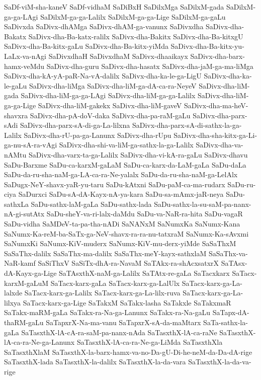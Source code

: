 {SaDf-viM-sha-kaneV
SaDf-vidhaM
SaDiBxH
SaDilxMga
SaDilxM-gada
SaDilxM-ga-ga-LAgi
SaDilxM-ga-ga-Lalilx
SaDilxM-ga-ga-Lige
SaDilxM-ga-gaLu
SaDivxda
SaDivx-dhAMga
SaDivx-dhAM-ga-vanunx
SaDivxdha
SaDivx-dha-Bakatx
SaDivx-dha-Ba-katx-ralilx
SaDivx-dha-Bakitx
SaDivx-dha-Ba-kitxgU
SaDivx-dha-Ba-kitx-gaLu
SaDivx-dha-Ba-kitx-yiMda
SaDivx-dha-Ba-kitx-yu-LaLx-va-nAgi
SaDivxdhaH
SaDivxdhaM
SaDivx-dhaaikayx
SaDivx-dha-barx-hamx-veMdu
SaDivx-dha-guru
SaDivx-dha-hasatx
SaDivx-dha-jaM-ga-ma-liMga
SaDivx-dha-kA-yA-paR-Na-vA-dalilx
SaDivx-dha-ka-le-ga-LigU
SaDivx-dha-ka-le-gaLu
SaDivx-dha-liMga
SaDivx-dha-liM-ga-dA-ca-ra-NeyeV
SaDivx-dha-liM-gada
SaDivx-dha-liM-ga-ga-LAgi
SaDivx-dha-liM-ga-ga-Lalilx
SaDivx-dha-liM-ga-ga-Lige
SaDivx-dha-liM-gakekx
SaDivx-dha-liM-gaveV
SaDivx-dha-ma-heV-shavxra
SaDivx-dha-pA-doV-daka
SaDivx-dha-pa-raM-gaLu
SaDivx-dha-parx-sAdi
SaDivx-dha-parx-sA-di-ga-La-lilxna
SaDivx-dha-parx-sA-di-sathx-la-ga-Lalilx
SaDivx-dha-rU-pa-ga-Lanunx
SaDivx-dha-rUpu
SaDivx-dha-sha-kitx-ga-Li-ga-nu-sA-ra-vAgi
SaDivx-dha-shi-va-liM-ga-sathx-la-ga-Lalilx
SaDivx-dha-va-nAMtu
SaDivx-dha-varx-ta-ga-Lalilx
SaDivx-dha-vi-kA-ra-gaLu
SaDivx-dhavu
SaDu-Barxme
SaDu-ca-karxM-gaLaM
SaDu-ca-karx-da-LaM-gaLa
SaDu-daLa
SaDu-da-ru-sha-naM-ga-LA-ca-ra-Ne-yalalx
SaDu-da-ru-sha-naM-ga-LelAlx
SaDugx-NeY-shavx-yaR-yu-taru
SaDu-kAtxni
SaDu-paM-ca-ma-rudarx
SaDu-ru-ciya
SaDurxci
SaDu-sA-dA-Kayx-nA-ya-kara
SaDu-sa-mAmx-jaR-neya
SaDu-sathxLa
SaDu-sathx-laM-gaLa
SaDu-sathx-lada
SaDu-sathx-la-su-saM-pa-nanx-nA-gi-sutAtx
SaDu-sheY-va-ri-lalx-daMdu
SaDu-va-NaR-ra-hita
SaDu-vagaR
SaDu-vidha
SaMDeV-ta-pa-tha-nADi
SaNANxM
SaNumxKa
SaNumx-Kana
SaNumx-Ka-reM-ba-SaTx-ga-NeV-shavx-ra-ra-nu-tatxraM
SaNumx-Ka-sAvxmi
SaNumxKi
SaNumx-KiV-muderx
SaNumx-KiV-mu-derx-yiMde
SaSaThxM
SaSaThx-dalilx
SaSaThx-ma-dalilx
SaSaThx-meY-kayx-sathxlaM
SaSaThx-va-NaR-kamf
SaSiThxV
SaSiTx-dhA-ra-NavaM
SaTAkx-ra-shAcxsatxrX
SaTAsx-dA-Kayx-ga-Lige
SaTAsxthX-naM-ga-Lalilx
SaTAtx-re-gaLa
SaTacxkarx
SaTacx-karxM-gaLuM
SaTacx-karx-gaLa
SaTacx-karx-ga-LalUlx
SaTacx-karx-ga-La-lalxde
SaTacx-karx-ga-Lalilx
SaTacx-karx-ga-La-lilx-ruva
SaTacx-karx-ga-La-lilxya
SaTacx-karx-ga-Lige
SaTakxM
SaTakx-lasha
SaTakxle
SaTakxmaR
SaTakx-maRM-gaLa
SaTakx-ra-Na-ga-Lanunx
SaTakx-ra-Na-gaLu
SaTapx-dA-thaRM-gaLu
SaTapxrX-Na-ma-vanu
SaTapxrX-sA-da-maMtarx
SaTa-sathx-la-gaLa
SaTasxthX-lA-cA-ra-saM-pa-nanx-nAda
SaTasxthX-lA-ca-raNe
SaTasxthX-lA-ca-ra-Ne-ga-Lanunx
SaTasxthX-lA-ca-ra-Ne-ga-LiMda
SaTasxthXla
SaTasxthXlaM
SaTasxthX-la-barx-hamx-va-no-Da-gU-Di-he-neM-da-Da-dA-rige
SaTasxthX-lada
SaTasxthX-la-dalilx
SaTasxthX-la-da-vara
SaTasxthX-la-da-va-rige
}
